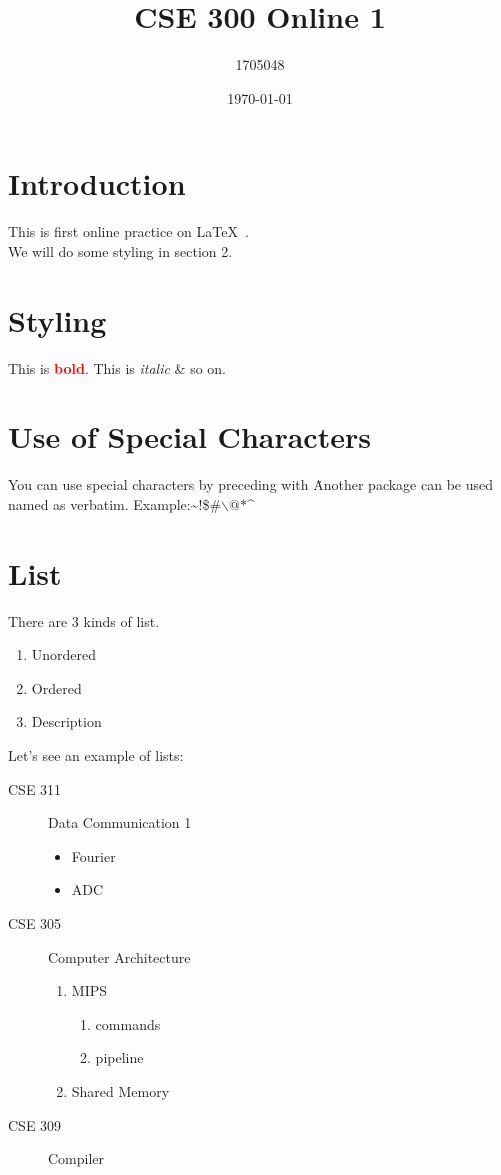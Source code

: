 \documentclass[14pt]{article}
\title{CSE 300 Online 1}
\author{1705048}
\date{\today}
\begin{document}
\maketitle
\tableofcontents
\pagebreak
\section{Introduction}
This is first online practice on \LaTeX\ .\\
We will do some styling in section 2.
\section{Styling}
    This is \textbf{\textcolor{red}{bold}}. This is \textit{italic} \& so on.
\section*{Use of Special Characters}
You can use special characters by preceding with \. Another package can be used named as verbatim. Example:\~{}$!$\$\#$\backslash$$@$$*$\^{}
\section{List}
There are 3 kinds of list.
\begin{enumerate}[i]
    \item Unordered
    \item Ordered
    \item Description
\end{enumerate}
\pagebreak
Let’s see an example of lists:
\begin{description}
    \item[CSE 311] Data Communication 1
    \begin{itemize}
        \item Fourier
        \item[] ADC
    \end{itemize}
    \item[CSE 305] Computer Architecture
    \begin{enumerate}
        \item MIPS
        \begin{enumerate}
        \item commands
        \item pipeline
        \end{enumerate}
        \item Shared Memory
    \end{enumerate}
    \item[CSE 309] Compiler
\end{description}
\end{document}
